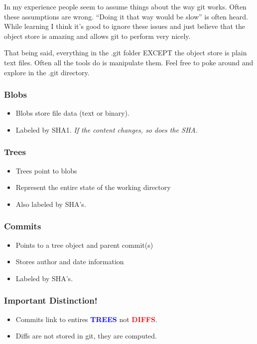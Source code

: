 In my experience people seem to assume things about the way git works. Often
these assumptions are wrong. ``Doing it that way would be slow'' is often
heard. While learning I think it's good to ignore these issues and just believe
that the object store is amazing and allows git to perform very nicely.

That being said, everything in the .git folder EXCEPT the object store is plain
text files. Often all the tools do is manipulate them. Feel free to poke around
and explore in the .git directory.

\begin{frame}
  \frametitle{Blobs}
  \begin{itemize}
  \item Blobs store file data (text or binary).
  \item Labeled by SHA1. \textit{If the content changes, so does the SHA.}
  \end{itemize}
\end{frame}

\begin{frame}
  \frametitle{Trees}
  \begin{itemize}
  \item Trees point to blobs
  \item Represent the entire state of the working directory
  \item Also labeled by SHA's.
  \end{itemize}
\end{frame}

\begin{frame}
  \frametitle{Commits}
  \begin{itemize}
  \item Points to a tree object and parent commit(s)
  \item Stores author and date information
  \item Labeled by SHA's.
  \end{itemize}
\end{frame}

\begin{frame}
  \frametitle{Important Distinction!}
  \begin{itemize}
  \item Commits link to entires \textcolor{blue}{\textbf{TREES}} not
  \textcolor{red}{\textbf{DIFFS}}.
  \item Diffs are not stored in git, they are computed.
  \end{itemize}
\end{frame}


